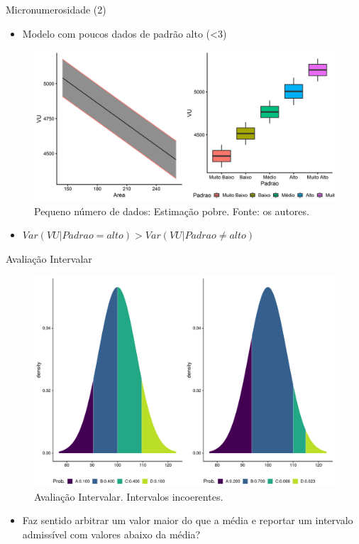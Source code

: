 \documentclass[9pt,ignorenonframetext,aspectratio=169]{beamer}
\providecommand{\tightlist}{%
  \setlength{\itemsep}{0pt}\setlength{\parskip}{0pt}}
\begin{document}
\begin{frame}{Micronumerosidade (2)}
\protect\hypertarget{micronumerosidade-2}{}

\begin{itemize}[<+->]
\tightlist
\item
  \alert<1>{Modelo com poucos dados de padrão alto (<3)}
\end{itemize}

\begin{figure}

{\centering \includegraphics[width=0.7\linewidth]{../../images/modelo1-1} 

}

\caption{Pequeno número de dados: Estimação pobre. Fonte: os autores.}\label{fig:unnamed-chunk-11}
\end{figure}

\begin{itemize}[<+->]
\tightlist
\item
  \alert<2>{$Var(VU|Padrao = alto) > Var(VU| Padrao \ne alto)$}
\end{itemize}

\end{frame}

\begin{frame}{Avaliação Intervalar}
\protect\hypertarget{avaliauxe7uxe3o-intervalar}{}

\begin{figure}

{\centering \includegraphics[width=0.5\linewidth]{index_files/figure-beamer/unnamed-chunk-12-1} 

}

\caption{Avaliação Intervalar. Intervalos incoerentes.}\label{fig:unnamed-chunk-12}
\end{figure}

\begin{itemize}[<+->]
\tightlist
\item
  Faz sentido arbitrar um valor maior do que a média e reportar um
  intervalo admissível com valores abaixo da média?
\end{itemize}

\end{frame}
\end{document}

